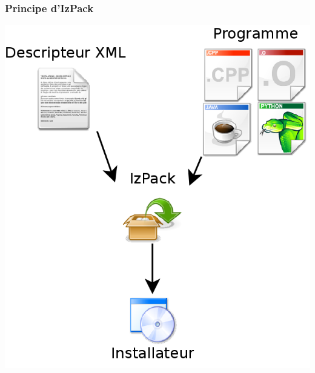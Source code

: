 \begin{frame}\frametitle{Principe d'IzPack}
\includegraphics[width=1\linewidth]{../image/izpackInstall.png}
\end{frame}

